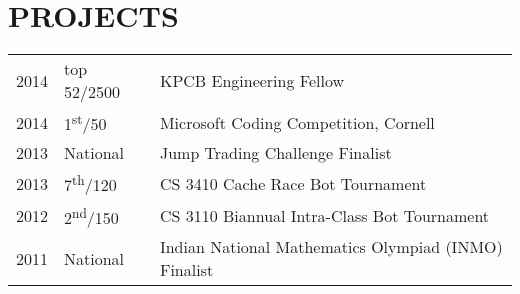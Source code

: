 \documentclass[]{deemweaver}
\begin{document}
\begin{minipage}[t]{0.66\textwidth}
\section{PROJECTS} 
\begin{tabular}{rll}
2014	     & top 52/2500  & KPCB Engineering Fellow\\
2014	     & 1\textsuperscript{st}/50  & Microsoft Coding Competition, Cornell\\
2013	     & National  & Jump Trading Challenge Finalist\\
2013     & 7\textsuperscript{th}/120 & CS 3410 Cache Race Bot Tournament  \\
2012     & 2\textsuperscript{nd}/150 & CS 3110 Biannual Intra-Class Bot Tournament \\
2011     & National & Indian National Mathematics Olympiad (INMO) Finalist \\
\end{tabular}
\sectionsep


\end{minipage} 
\end{document}
